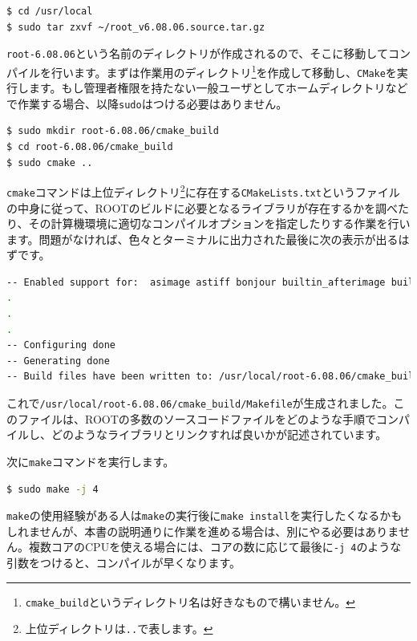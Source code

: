 \begin{lstlisting}[language=bash]
$ cd /usr/local
$ sudo tar zxvf ~/root_v6.08.06.source.tar.gz
\end{lstlisting}

\texttt{root-6.08.06}という名前のディレクトリが作成されるので、そこに移動してコンパイルを行います。まずは作業用のディレクトリ\footnote{\texttt{cmake\_build}というディレクトリ名は好きなもので構いません。}を作成して移動し、\texttt{CMake}を実行します。もし管理者権限を持たない一般ユーザとしてホームディレクトリなどで作業する場合、以降\texttt{sudo}はつける必要はありません。

\begin{lstlisting}[language=bash]
$ sudo mkdir root-6.08.06/cmake_build
$ cd root-6.08.06/cmake_build
$ sudo cmake ..
\end{lstlisting}

\texttt{cmake}コマンドは上位ディレクトリ\footnote{上位ディレクトリは\texttt{..}で表します。}に存在する\texttt{CMakeLists.txt}というファイルの中身に従って、ROOTのビルドに必要となるライブラリが存在するかを調べたり、その計算機環境に適切なコンパイルオプションを指定したりする作業を行います。問題がなければ、色々とターミナルに出力された最後に次の表示が出るはずです。
\begin{lstlisting}[language=bash]
-- Enabled support for:  asimage astiff bonjour builtin_afterimage builtin_ftgl builtin_freetype builtin_gl2ps builtin_glew builtin_unuran builtin_llvm cxx11 cling cocoa exceptions explicitlink fitsio fortran gviz genvector krb5 ldap memstat opengl pch python shared sqlite thread tmva vdt xml
.
.
.
-- Configuring done
-- Generating done
-- Build files have been written to: /usr/local/root-6.08.06/cmake_build
\end{lstlisting}

これで\texttt{/usr/local/root-6.08.06/cmake\_build/Makefile}が生成されました。このファイルは、ROOTの多数のソースコードファイルをどのような手順でコンパイルし、どのようなライブラリとリンクすれば良いかが記述されています。

次に\texttt{make}コマンドを実行します。
\begin{lstlisting}[language=bash]
$ sudo make -j 4
\end{lstlisting}
\texttt{make}の使用経験がある人は\texttt{make}の実行後に\texttt{make install}を実行したくなるかもしれませんが、本書の説明通りに作業を進める場合は、別にやる必要はありません。複数コアのCPUを使える場合には、コアの数に応じて最後に\texttt{-j 4}のような引数をつけると、コンパイルが早くなります。

